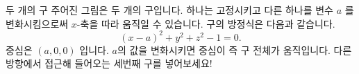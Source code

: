\begin{surferPage}{두 개의 구}
주어진 그림은 두 개의 구입니다. 하나는 고정시키고 다른 하나를 변수 $a$ 를 변화시킴으로써 $x$-축을 따라 움직일 수 있습니다.
구의 방정식은 다음과 같습니다.
\[(x-a)^2+y^2+z^2-1=0.\]
중심은 $(a,0,0)$ 입니다.  $a$의 값을 변화시키면 중심이 즉 구 전체가 움직입니다. 다른 방향에서 접근해 들어오는 세번째 구를 넣어보세요!
\end{surferPage}
